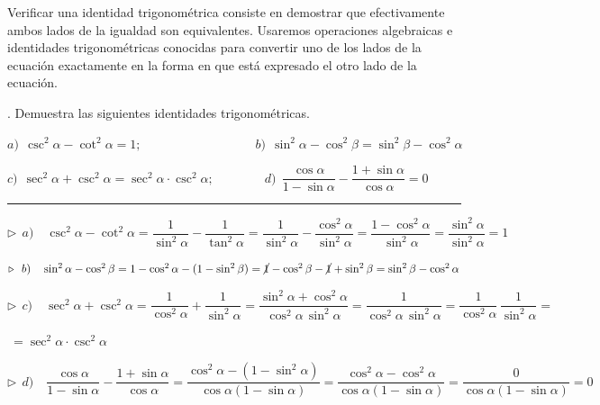 Verificar una identidad trigonométrica consiste en demostrar que efectivamente ambos lados de la igualdad son equivalentes. Usaremos operaciones algebraicas e identidades trigonométricas conocidas para convertir uno de los lados de la ecuación exactamente en la forma en que está expresado el otro lado de la ecuación.
\vspace{5mm}
\begin{miejercicio}
. Demuestra las siguientes identidades trigonométricas.

\vspace{2mm} $a)\ \ \csc^2 \alpha-\cot^2\alpha=1 ; \qquad  \qquad \qquad  \qquad \quad b) \ \   \sin^2 \alpha-\cos^2 \beta=\sin^2 \beta - \cos^2 \alpha$

\vspace{2mm} $c)\ \ \sec^2 \alpha + \csc^2 \alpha=\sec^2 \alpha \cdot \csc^2 \alpha;\qquad  \qquad d)\ \ \dfrac{\cos \alpha}{1-\sin \alpha}-\dfrac{1+\sin \alpha}{\cos \alpha}=0$

\rule{250pt}{0.1pt}	

\vspace{5mm} $\triangleright \ \  a)\quad \csc^2 \alpha - \cot^2 \alpha = \dfrac{1}{\sin^2 \alpha}-\dfrac{1}{\tan^2 \alpha}=\dfrac{1}{\sin^2 \alpha}-\dfrac{\cos^2 \alpha }{\sin^2 \alpha}=\dfrac{1-\cos^2\alpha}{\sin^2 \alpha}=\dfrac{\sin^2 \alpha}{\sin^2 \alpha}=1$


\vspace{5mm} $\triangleright \ \  b)\quad \sin^2 \alpha-\cos^2 \beta= 1-\cos^2 \alpha-(1-\sin^2 \beta)=\cancel{1} -\cos^2 \beta -\cancel{1}+\sin^2 \beta=\sin^2 \beta - \cos^2 \alpha $


\vspace{5mm} $\triangleright \ \  c)\quad \sec^2 \alpha + \csc^2 \alpha= \dfrac{1}{\cos^2 \alpha} + \dfrac{1}{\sin^2 \alpha}= \dfrac{\sin^2 \alpha + \cos^2 \alpha}{\cos^2 \alpha \, \sin^2 \alpha}= \dfrac{1}{\cos^2 \alpha \, \sin^2 \alpha}=\dfrac{1}{\cos^2 \alpha}\, \dfrac
{1}{\sin^2 \alpha}=$

\vspace{2mm}\hspace{1.2cm} $\ = \sec^2 \alpha \cdot \csc^2 \alpha$

\vspace{5mm} $\triangleright \ \  d)\quad \dfrac{\cos \alpha}{1-\sin \alpha}-\dfrac{1+\sin \alpha}{\cos \alpha}=\dfrac{\cos^2 \alpha - (1-\sin^2 \alpha)}{\cos \alpha(1-\sin \alpha)}= \dfrac{\cos^2 \alpha - \cos^2 \alpha }{\cos \alpha(1-\sin \alpha)}=\dfrac{0}{\cos \alpha(1-\sin \alpha)}=0$

\end{miejercicio}








